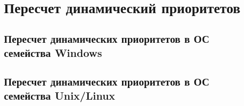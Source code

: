 \chapter{Пересчет динамический приоритетов}

\section{Пересчет динамических приоритетов в ОС семейства Windows}

\section{Пересчет динамических приоритетов в ОС семейства Unix/Linux}

